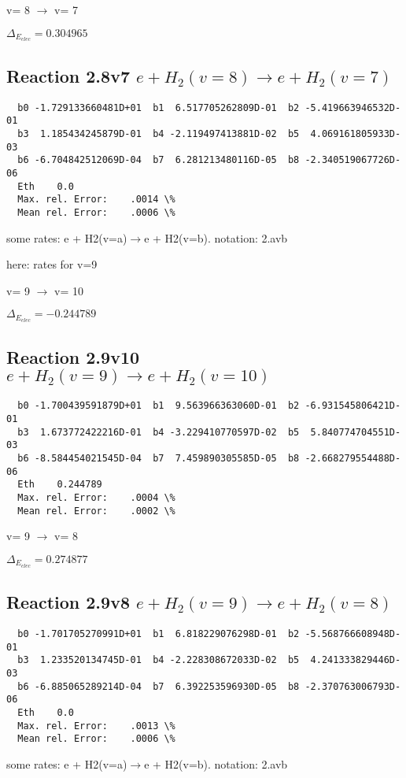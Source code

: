 \documentclass[12pt,dvipdfmx]{article}
\begin{document}
  v=  8 $\rightarrow$ v= 7

$\Delta_{E_{elec}}= 0.304965$


\subsection{
Reaction 2.8v7
$ e + H_2(v=8) \rightarrow e + H_2(v=7) $
}


\begin{small}\begin{verbatim}
  b0 -1.729133660481D+01  b1  6.517705262809D-01  b2 -5.419663946532D-01
  b3  1.185434245879D-01  b4 -2.119497413881D-02  b5  4.069161805933D-03
  b6 -6.704842512069D-04  b7  6.281213480116D-05  b8 -2.340519067726D-06
  Eth    0.0
  Max. rel. Error:    .0014 \%
  Mean rel. Error:    .0006 \%

\end{verbatim}\end{small}
\newpage
some rates: e + H2(v=a)$\rightarrow$e + H2(v=b). notation: 2.avb

here: rates for v=9


  v=  9 $\rightarrow$ v= 10

$\Delta_{E_{elec}}=-0.244789$


\subsection{
Reaction 2.9v10
$ e + H_2(v=9) \rightarrow e + H_2(v=10) $
}


\begin{small}\begin{verbatim}
  b0 -1.700439591879D+01  b1  9.563966363060D-01  b2 -6.931545806421D-01
  b3  1.673772422216D-01  b4 -3.229410770597D-02  b5  5.840774704551D-03
  b6 -8.584454021545D-04  b7  7.459890305585D-05  b8 -2.668279554488D-06
  Eth    0.244789
  Max. rel. Error:    .0004 \%
  Mean rel. Error:    .0002 \%

\end{verbatim}\end{small}

  v=  9 $\rightarrow$ v= 8

$\Delta_{E_{elec}}= 0.274877$


\subsection{
Reaction 2.9v8
$ e + H_2(v=9) \rightarrow e + H_2(v=8) $
}


\begin{small}\begin{verbatim}
  b0 -1.701705270991D+01  b1  6.818229076298D-01  b2 -5.568766608948D-01
  b3  1.233520134745D-01  b4 -2.228308672033D-02  b5  4.241333829446D-03
  b6 -6.885065289214D-04  b7  6.392253596930D-05  b8 -2.370763006793D-06
  Eth    0.0
  Max. rel. Error:    .0013 \%
  Mean rel. Error:    .0006 \%

\end{verbatim}\end{small}
\newpage
some rates: e + H2(v=a)$\rightarrow$e + H2(v=b). notation: 2.avb
\end{document}
